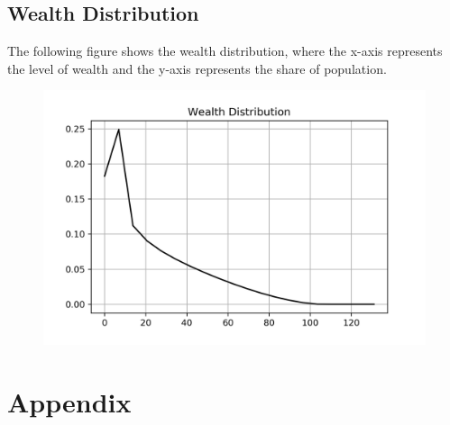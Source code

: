 \documentclass[]{article}
\begin{document}
\subsection{Wealth Distribution}
The following figure shows the wealth distribution, where the x-axis represents the level of wealth and the y-axis represents the share of population.
\begin{figure}[H]
	\centering
	\includegraphics{Figures/Figure_WealthDistribution}
	\label{figure:1}
\end{figure}

\newpage
\section{Appendix}{\label{Appendix}}
	

\newpage 




\end{document}
